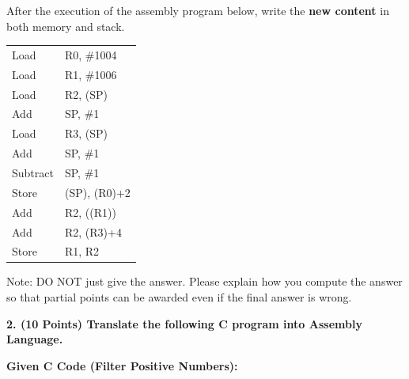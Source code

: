 \documentclass[a4paper,12pt]{article}
\begin{document}
\vspace{0.5cm}
After the execution of the assembly program below, write the \textbf{new content} in both memory and stack.

\vspace{0.5cm}
\begin{minipage}{0.8\textwidth}
\begin{tabular}{ll}
Load & R0, \#1004 \\
Load & R1, \#1006 \\
Load & R2, (SP) \\
Add & SP, \#1 \\
Load & R3, (SP) \\
Add & SP, \#1 \\
Subtract & SP, \#1 \\
Store & (SP), (R0)+2 \\
Add & R2, ((R1)) \\
Add & R2, (R3)+4 \\
Store & R1, R2 \\
\end{tabular}
\end{minipage}

\vspace{0.5cm}
Note: DO NOT just give the answer. Please explain how you compute the answer so that partial points can be awarded even if the final answer is wrong.

\vspace{5cm} %

\newpage

\textbf{2. (10 Points) Translate the following C program into Assembly Language.}

\textbf{Given C Code (Filter Positive Numbers):}
\begin{center}
\end{center}
\end{document}
